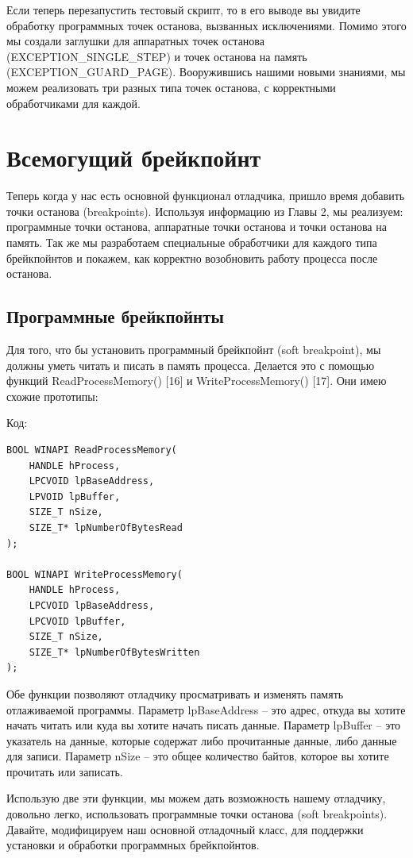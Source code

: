 \documentclass[12pt]{book}
\begin{document}
Если теперь перезапустить тестовый скрипт, то в его выводе вы увидите обработку программных точек останова, вызванных исключениями. Помимо этого мы создали заглушки для аппаратных точек останова (EXCEPTION\_SINGLE\_STEP) и точек останова на память (EXCEPTION\_GUARD\_PAGE). Вооружившись нашими новыми знаниями, мы можем реализовать три разных типа точек останова, с корректными обработчиками для каждой.

\section{Всемогущий брейкпойнт}

Теперь когда у нас есть основной функционал отладчика, пришло время добавить точки останова (breakpoints). Используя информацию из Главы 2, мы реализуем: программные точки останова, аппаратные точки останова и точки останова на память. Так же мы разработаем специальные обработчики для каждого типа брейкпойнтов и покажем, как корректно возобновить работу процесса после останова.

\subsection{Программные брейкпойнты}

Для того, что бы установить программный брейкпойнт (soft breakpoint), мы должны уметь читать и писать в память процесса. Делается это с помощью функций ReadProcessMemory() [16] и WriteProcessMemory() [17]. Они имею схожие прототипы:

Код:
\begin{lstlisting}
BOOL WINAPI ReadProcessMemory(
    HANDLE hProcess,
    LPCVOID lpBaseAddress,
    LPVOID lpBuffer,
    SIZE_T nSize,
    SIZE_T* lpNumberOfBytesRead
);

BOOL WINAPI WriteProcessMemory(
    HANDLE hProcess,
    LPCVOID lpBaseAddress,
    LPCVOID lpBuffer,
    SIZE_T nSize,
    SIZE_T* lpNumberOfBytesWritten
);
\end{lstlisting}

Обе функции позволяют отладчику просматривать и изменять память отлаживаемой программы. Параметр lpBaseAddress – это адрес, откуда вы хотите начать читать или куда вы хотите начать писать данные. Параметр lpBuffer – это указатель на данные, которые содержат либо прочитанные данные, либо данные для записи. Параметр nSize – это общее количество байтов, которое вы хотите прочитать или записать.

Использую две эти функции, мы можем дать возможность нашему отладчику, довольно легко, использовать программные точки останова (soft breakpoints). Давайте, модифицируем наш основной отладочный класс, для поддержки установки и обработки программных брейкпойнтов. 
\end{document}

